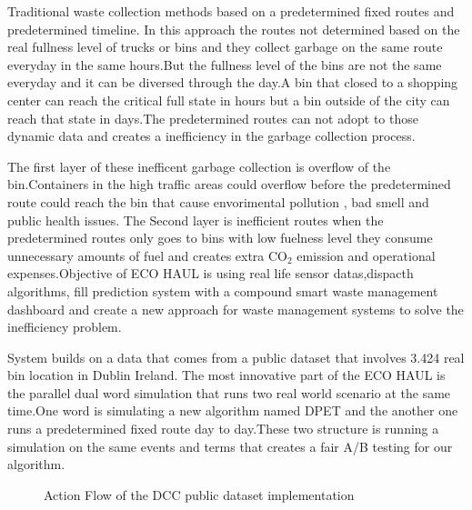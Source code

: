 \documentclass[12pt,a4paper]{report}
\begin{document}
\indent Traditional waste collection methods based on a predetermined fixed routes and predetermined timeline.
In this approach the routes not determined based on the real fullness level of trucks or bins and they collect garbage on the same route everyday in the same hours.But the fullness level of the bins are not the same everyday and it can be diversed through the day.A bin that closed to a shopping center can reach the critical full state in hours but a bin outside of the city can reach that state in days.The predetermined routes can not adopt to those dynamic data and creates a inefficiency in the garbage collection process.

\indent The first layer of these inefficent garbage collection is overflow of the bin.Containers in the high traffic areas could overflow before the predetermined route could reach the bin that cause envorimental pollution , bad smell and public health issues. The Second layer is inefficient routes when the predetermined routes only goes to bins with low fuelness level they consume unnecessary amounts of fuel and creates extra CO$_2$ emission and operational expenses.Objective of ECO HAUL is using real life sensor datas,dispacth algorithms, fill prediction system with a  compound smart waste management dashboard and create a new approach for waste management systems to solve the inefficiency problem.

\indent System builds on  a data that comes from a public dataset that involves 3.424 real bin location in Dublin Ireland.
The most innovative part of the ECO HAUL is the parallel dual word simulation that runs two real world scenario at the same time.One word is simulating a new algorithm named DPET and the another one runs a predetermined fixed route day to day.These two structure is running a simulation on the same events and terms that creates a fair A/B testing for our algorithm.

\begin{figure}[H]
\centering
{}
\caption{Action Flow of the DCC public dataset implementation}
\label{fig:data_intake}
\end{figure}
\end{document}
